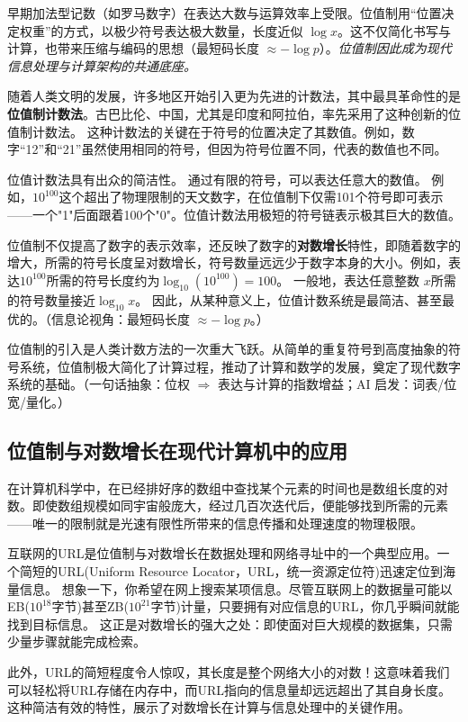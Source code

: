 早期加法型记数（如罗马数字）在表达大数与运算效率上受限。位值制用“位置决定权重”的方式，以极少符号表达极大数量，长度近似 $\log x$。这不仅简化书写与计算，也带来压缩与编码的思想（最短码长度 $\approx-\log p$）。\emph{位值制因此成为现代信息处理与计算架构的共通底座。}

随着人类文明的发展，许多地区开始引入更为先进的计数法，其中最具革命性的是{\bf 位值制计数法}。古巴比伦、中国，尤其是印度和阿拉伯，率先采用了这种创新的位值制计数法。
这种计数法的关键在于符号的位置决定了其数值。例如，数字“12”和“21”虽然使用相同的符号，但因为符号位置不同，代表的数值也不同。

位值计数法具有出众的简洁性。
通过有限的符号，可以表达任意大的数值。
例如，$10^{100}$这个超出了物理限制的天文数字，在位值制下仅需101个符号即可表示——一个"1"后面跟着100个"0"。位值计数法用极短的符号链表示极其巨大的数值。

位值制不仅提高了数字的表示效率，还反映了数字的{\bf 对数增长}特性，即随着数字的增大，所需的符号长度呈对数增长，符号数量远远少于数字本身的大小。例如，表达$10^{100}$所需的符号长度约为$\log_{10}(10^{100})=100$。
一般地，表达任意整数 $x$所需的符号数量接近${\log_{10} x}$。
因此，从某种意义上，位值计数系统是最简洁、甚至最优的。{（信息论视角：最短码长度 $\approx -\log p$。）}

位值制的引入是人类计数方法的一次重大飞跃。从简单的重复符号到高度抽象的符号系统，位值制极大简化了计算过程，推动了计算和数学的发展，奠定了现代数字系统的基础。{（一句话抽象：位权 $\Rightarrow$ 表达与计算的指数增益；AI 启发：词表/位宽/量化。）}

\subsection{位值制与对数增长在现代计算机中的应用}
在计算机科学中，在已经排好序的数组中查找某个元素的时间也是数组长度的对数。即使数组规模如同宇宙般庞大，经过几百次迭代后，便能够找到所需的元素——唯一的限制就是光速有限性所带来的信息传播和处理速度的物理极限。

互联网的URL是位值制与对数增长在数据处理和网络寻址中的一个典型应用。一个简短的URL(Uniform Resource Locator，URL，统一资源定位符)迅速定位到海量信息。
想象一下，你希望在网上搜索某项信息。尽管互联网上的数据量可能以EB($10^{18}$字节)甚至ZB($10^{21}$字节)计量，只要拥有对应信息的URL，你几乎瞬间就能找到目标信息。
这正是对数增长的强大之处：即使面对巨大规模的数据集，只需少量步骤就能完成检索。

此外，URL的简短程度令人惊叹，其长度是整个网络大小的对数！这意味着我们可以轻松将URL存储在内存中，而URL指向的信息量却远远超出了其自身长度。
这种简洁有效的特性，展示了对数增长在计算与信息处理中的关键作用。

